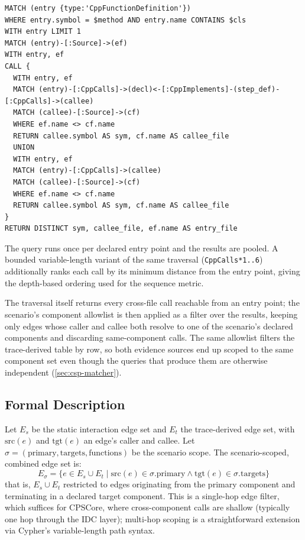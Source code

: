 \begin{verbatim}
MATCH (entry {type:'CppFunctionDefinition'})
WHERE entry.symbol = $method AND entry.name CONTAINS $cls
WITH entry LIMIT 1
MATCH (entry)-[:Source]->(ef)
WITH entry, ef
CALL {
  WITH entry, ef
  MATCH (entry)-[:CppCalls]->(decl)<-[:CppImplements]-(step_def)-[:CppCalls]->(callee)
  MATCH (callee)-[:Source]->(cf)
  WHERE ef.name <> cf.name
  RETURN callee.symbol AS sym, cf.name AS callee_file
  UNION
  WITH entry, ef
  MATCH (entry)-[:CppCalls]->(callee)
  MATCH (callee)-[:Source]->(cf)
  WHERE ef.name <> cf.name
  RETURN callee.symbol AS sym, cf.name AS callee_file
}
RETURN DISTINCT sym, callee_file, ef.name AS entry_file
\end{verbatim}

The query runs once per declared entry point and the results are
pooled. A bounded variable-length variant of the same traversal
(\texttt{CppCalls*1..6}) additionally ranks each call by its minimum
distance from the entry point, giving the depth-based ordering used for
the sequence metric.

The traversal itself returns every cross-file call reachable from an
entry point; the scenario's component allowlist is then applied as a
filter over the results, keeping only edges whose caller and callee
both resolve to one of the scenario's declared components and
discarding same-component calls. The same allowlist filters the
trace-derived table by row, so both evidence sources end up scoped to
the same component set even though the queries that produce them are
otherwise independent (\cref{sec:csp-matcher}).

\subsection{Formal Description}

Let $E_s$ be the static interaction edge set and $E_t$ the trace-derived
edge set, with $\text{src}(e)$ and $\text{tgt}(e)$ an edge's caller and
callee. Let $\sigma = (\text{primary}, \text{targets}, \text{functions})$
be the scenario scope. The scenario-scoped, combined edge set is:
\[
  E_\sigma
  = \{ e \in E_s \cup E_t \mid \text{src}(e) \in \sigma.\text{primary}
       \land \text{tgt}(e) \in \sigma.\text{targets} \}
\]
that is, $E_s \cup E_t$ restricted to edges originating from the primary
component and terminating in a declared target component. This is a
single-hop edge filter, which suffices for CPSCore, where cross-component
calls are shallow (typically one hop through the IDC layer); multi-hop
scoping is a straightforward extension via Cypher's variable-length path
syntax.

